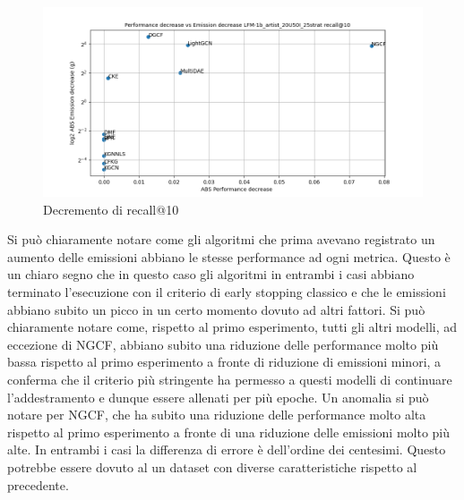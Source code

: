 \begin{figure}[H]
    \centering
     \includegraphics[width=\textwidth]{images/decrement_recall@10_LFM-1b_artist_20U50I_25strat.png}
    \caption{Decremento di recall@10}
\end{figure}


\noindent Si può chiaramente notare come gli algoritmi che prima avevano registrato un aumento delle emissioni abbiano le stesse performance ad ogni metrica.
Questo è un chiaro segno che in questo caso gli algoritmi in entrambi i casi abbiano terminato l'esecuzione con il criterio di early stopping classico e che le emissioni abbiano subito un picco in un certo momento dovuto ad altri fattori.
Si può chiaramente notare come, rispetto al primo esperimento, tutti gli altri modelli, ad eccezione di NGCF, abbiano subito una riduzione delle performance molto più bassa rispetto al primo esperimento a fronte di riduzione di emissioni minori, a conferma che il criterio più stringente ha permesso a questi modelli di continuare l'addestramento e dunque essere allenati per più epoche.
Un anomalia si può notare per NGCF, che ha subito una riduzione delle performance molto alta rispetto al primo esperimento a fronte di una riduzione delle emissioni molto più alte. In entrambi i casi la differenza di errore è dell'ordine dei centesimi. Questo potrebbe essere dovuto al un dataset con diverse caratteristiche rispetto al precedente.

